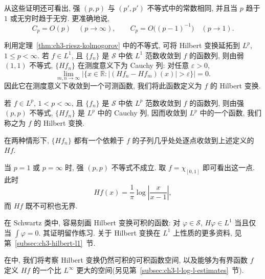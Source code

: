 从这些证明还可看出, 强 $(p,p)$ 与 $(p',p')$ 不等式中的常数相同, 并且当 $p$ 趋于 $1$ 或无穷时趋于无穷. 更准确地说,
\[
 C_p=O(p)\quad(p\to\infty),
 \qquad
 C_p=O\bigl((p-1)^{-1}\bigr)\quad(p\to1).
\]

利用定理~\ref{thm:ch3-riesz-kolmogorov} 中的不等式, 可将 Hilbert 变换延拓到 $L^p$, $1\le p<\infty$. 若 $f\in L^1$, 且 $\{f_n\}$ 是 $\mathcal S$ 中依 $L^1$ 范数收敛到 $f$ 的函数列, 则由弱 $(1,1)$ 不等式, $\{Hf_n\}$ 在测度意义下为 Cauchy 列: 对任意 $\varepsilon>0$,
\[
 \lim_{m,n\to\infty}
 \bigl|\{x\in\mathbb R:|(Hf_n-Hf_m)(x)|>\varepsilon\}\bigr|=0.
\]
因此它在测度意义下收敛到一个可测函数, 我们将此函数定义为 $f$ 的 Hilbert 变换.

若 $f\in L^p$, $1<p<\infty$, 且 $\{f_n\}$ 是 $\mathcal S$ 中依 $L^p$ 范数收敛到 $f$ 的函数列, 则由强 $(p,p)$ 不等式, $\{Hf_n\}$ 是 $L^p$ 中的 Cauchy 列, 因而收敛到 $L^p$ 中的一个函数, 我们称之为 $f$ 的 Hilbert 变换.

在两种情形下, $\{Hf_n\}$ 都有一个依赖于 $f$ 的子列几乎处处逐点收敛到上述定义的 $Hf$.

当 $p=1$ 或 $p=\infty$ 时, 强 $(p,p)$ 不等式不成立. 取 $f=\chi_{[0,1]}$ 即可看出这一点. 此时
\[
 Hf(x)=\frac1\pi\log\left|\frac{x}{x-1}\right|,
\]
而 $Hf$ 既不可积也无界.

\hypertarget{chapter-03-page-067}{}
在 Schwartz 类中, 容易刻画 Hilbert 变换可积的函数: 对 $\varphi\in\mathcal S$, $H\varphi\in L^1$ 当且仅当 $\int\varphi=0$. 其证明留作练习. 关于 Hilbert 变换在 $L^1$ 上性质的更多资料, 见第~\ref{subsec:ch3-hilbert-l1}~节.

在中, 我们将考察 Hilbert 变换仍然可积的可积函数空间, 以及能够为有界函数 $f$ 定义 $Hf$ 的一个比 $L^\infty$ 更大的空间(另见第~\ref{subsec:ch3-l-log-l-estimates}~节).

